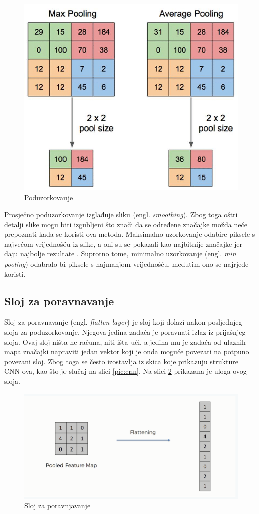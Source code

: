 \begin{figure}[htb]
    \centering
    \includegraphics[width=0.5\linewidth]{Chapters/neuronska_mreza/CNN/pooling.png} 
    \caption{Poduzorkovanje \cite{pooling1}}
    \label{pic:pooling}
\end{figure}

Prosječno poduzorkovanje izglađuje sliku (engl. \textit{smoothing}). Zbog toga oštri detalji slike
mogu biti izgubljeni što znači da se određene značajke možda neće prepoznati kada se 
koristi ova metoda. Maksimalno uzorkovanje odabire piksele s najvećom vrijednošću iz slike,
a oni su se pokazali kao najbitnije značajke jer daju najbolje rezultate \cite{cnn_whatis}.
Suprotno tome, minimalno uzorkovanje (engl. \textit{min pooling}) odabralo bi piksele s najmanjom
vrijednošću, međutim ono se najrjeđe koristi.

\subsection{Sloj za poravnavanje}
\label{sub:flat}
Sloj za poravnavanje (engl. \textit{flatten layer}) je sloj koji dolazi nakon posljednjeg sloja
za poduzorkovanje. Njegova jedina zadaća je poravnati izlaz iz prijašnjeg sloja.
Ovaj sloj ništa ne računa, niti išta uči, a jedina mu je zadaća od ulaznih mapa značajki
napraviti jedan vektor koji je onda moguće povezati na potpuno povezani sloj. Zbog
toga se često izostavlja iz skica koje prikazuju strukture CNN-ova, kao što je slučaj
na slici \ref{pic:cnn}. Na slici \ref{pic:flatten} prikazana je uloga ovog sloja.

\begin{figure}[htb]
    \centering
    \includegraphics[width=0.5\linewidth]{Chapters/neuronska_mreza/CNN/flatten.png} 
    \caption{Sloj za poravnjavanje \cite{flatten}}
    \label{pic:flatten}
\end{figure}


